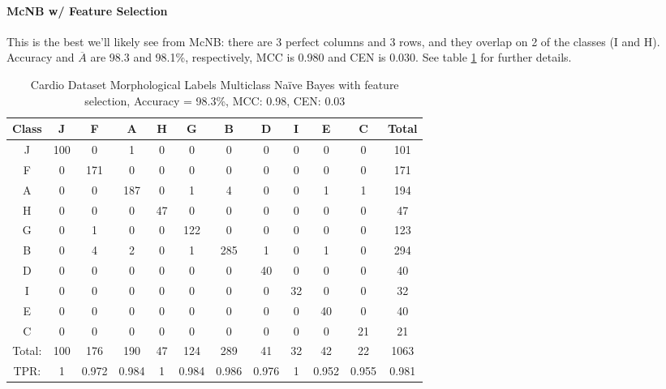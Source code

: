 \paragraph{McNB w/ Feature Selection}
This is the best we'll likely see from McNB: there are 3 perfect columns and 3 rows, and they overlap on 2 of the classes (I and H).  Accuracy and $\overline{A}$ are 98.3 and 98.1\%, respectively, MCC is 0.980 and CEN is 0.030.  See table \ref{tab:cardiomorphmcnb} for further details.
\begin{table}[h!]
	\centering
	\begin{tabular}{|c|c|c|c|c|c|c|c|c|c|c|c|}
		\hline
	Class&J&F&A&H&G&B&D&I&E&C&Total\\
	\hline
	J&100&0&1&0&0&0&0&0&0&0&101\\
	F&0&171&0&0&0&0&0&0&0&0&171\\
	A&0&0&187&0&1&4&0&0&1&1&194\\
	H&0&0&0&47&0&0&0&0&0&0&47\\
	G&0&1&0&0&122&0&0&0&0&0&123\\
	B&0&4&2&0&1&285&1&0&1&0&294\\
	D&0&0&0&0&0&0&40&0&0&0&40\\
	I&0&0&0&0&0&0&0&32&0&0&32\\
	E&0&0&0&0&0&0&0&0&40&0&40\\
	C&0&0&0&0&0&0&0&0&0&21&21\\
\hline
	Total:&100&176&190&47&124&289&41&32&42&22&1063\\
	TPR:&1&0.972&0.984&1&0.984&0.986&0.976&1&0.952&0.955&0.981\\
	
		\hline
	\end{tabular}
	\caption[Cardiotocography Morphology:  Na\"ive Bayes without Feature Selection Confusion Matrix]{Cardio Dataset Morphological Labels Multiclass Na\"ive Bayes with feature selection, Accuracy = 98.3\%, MCC: 0.98, CEN: 0.03}
	\label{tab:cardiomorphmcnb}
\end{table}
